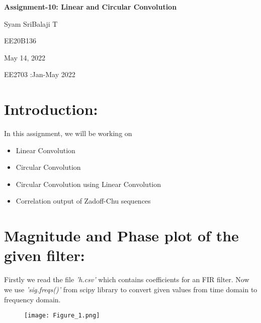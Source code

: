 \documentclass[12pt]{article}
\newcommand\titleofdoc{\LARGE{\textbf{Assignment-10: Linear and Circular Convolution}}}
\begin{document}
\begin{titlepage}
   \begin{center}
        \vspace*{4cm} %

        \Huge{\titleofdoc} 

        \vspace{3 cm}
        \Large{Syam SriBalaji T}
       
        \vspace{0.25cm}
        \large{EE20B136}
       
        \vspace{3 cm}
        \Large{May 14, 2022}
        
        \vspace{0.25 cm}
        \Large{EE2703 :Jan-May 2022}
       

       \vfill
    \end{center}
\end{titlepage}

\setcounter{page}{2}
\pagestyle{fancy}
\fancyhf{}
\rhead{\thepage}

\section*{\textbf{Introduction:}}
In this assignment, we will be working on 
\begin{itemize}
  \item Linear Convolution
  \item Circular Convolution
  \item Circular Convolution using Linear Convolution
  \item Correlation output of Zadoff-Chu sequences
\end{itemize}

\section*{Magnitude and Phase plot of the given filter:}

Firstly we read the file \textit{'h.csv'} which contains coefficients for an FIR filter. Now we use \textit{'sig.freqs()'} from scipy library to convert given values from time domain to frequency domain.

\begin{figure}[h!]
\centering
\texttt{[image: Figure\_1.png]}
\end{figure}
\end{document}
